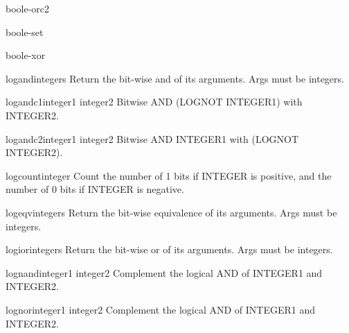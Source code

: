 \begin{constant}{boole-orc2}{}{}{}
  
\end{constant}

\begin{constant}{boole-set}{}{}{}
  
\end{constant}

\begin{constant}{boole-xor}{}{}{}
  
\end{constant}

\begin{function}{logand}{\rest integers}{}{}
  Return the bit-wise and of its arguments. Args must be integers.
\end{function}

\begin{function}{logandc1}{integer1 integer2}{}{}
  Bitwise AND (LOGNOT INTEGER1) with INTEGER2.
\end{function}

\begin{function}{logandc2}{integer1 integer2}{}{}
  Bitwise AND INTEGER1 with (LOGNOT INTEGER2).
\end{function}

\begin{function}{logcount}{integer}{}{}
  Count the number of 1 bits if INTEGER is positive, and the number of 0 bits
  if INTEGER is negative.
\end{function}

\begin{function}{logeqv}{\rest integers}{}{}
  Return the bit-wise equivalence of its arguments. Args must be integers.
\end{function}

\begin{function}{logior}{\rest integers}{}{}
  Return the bit-wise or of its arguments. Args must be integers.
\end{function}

\begin{function}{lognand}{integer1 integer2}{}{}
  Complement the logical AND of INTEGER1 and INTEGER2.
\end{function}

\begin{function}{lognor}{integer1 integer2}{}{}
  Complement the logical AND of INTEGER1 and INTEGER2.
\end{function}

